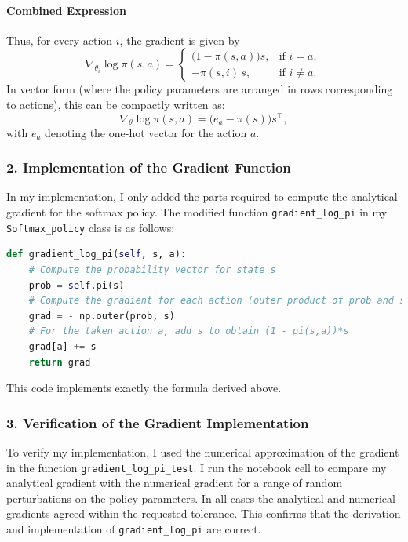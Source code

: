 \paragraph{Combined Expression}  
Thus, for every action $i$, the gradient is given by
\[
\nabla_{\theta_i} \log \pi(s,a) =
\begin{cases}
\bigl(1-\pi(s,a)\bigr) s, & \text{if } i=a,\\[1mm]
-\pi(s,i)\, s, & \text{if } i\neq a.
\end{cases}
\]
In vector form (where the policy parameters are arranged in rows corresponding to actions), this can be compactly written as:
\[
\nabla_{\theta} \log \pi(s,a) = \bigl(e_a - \pi(s)\bigr) s^\top,
\]
with $e_a$ denoting the one-hot vector for the action $a$.

\subsubsection*{2. Implementation of the Gradient Function}

In my implementation, I only added the parts required to compute the analytical gradient for the softmax policy. The modified function \texttt{gradient\_log\_pi} in my \texttt{Softmax\_policy} class is as follows:

\begin{lstlisting}[language=Python, caption=Modified gradient\_log\_pi function]
def gradient_log_pi(self, s, a):
    # Compute the probability vector for state s
    prob = self.pi(s)
    # Compute the gradient for each action (outer product of prob and s)
    grad = - np.outer(prob, s)
    # For the taken action a, add s to obtain (1 - pi(s,a))*s
    grad[a] += s
    return grad
\end{lstlisting}

This code implements exactly the formula derived above.

\subsubsection*{3. Verification of the Gradient Implementation}

To verify my implementation, I used the numerical approximation of the gradient in the function \texttt{gradient\_log\_pi\_test}. I run the notebook cell to compare my analytical gradient with the numerical gradient for a range of random perturbations on the policy parameters. In all cases the analytical and numerical gradients agreed within the requested tolerance. This confirms that the derivation and implementation of \texttt{gradient\_log\_pi} are correct.

